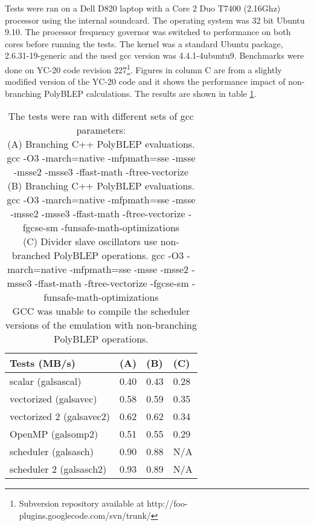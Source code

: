 \documentclass[11pt,a4paper]{article}
\begin{document}
Tests were ran on a Dell D820 laptop with a Core 2 Duo T7400 (2.16Ghz) processor using the internal soundcard. The operating system was 32 bit Ubuntu 9.10. The processor frequency governor was switched to performance on both cores before running the tests. The kernel was a standard Ubuntu package, 2.6.31-19-generic and the used gcc version was 4.4.1-4ubuntu9. Benchmarks were done on YC-20 code revision 227\footnote{Subversion repository available at http://foo-plugins.googlecode.com/svn/trunk/}. Figures in column C are from a slightly modified version of the YC-20 code and it shows the performance impact of non-branching PolyBLEP calculations. The results are shown in table \ref{table:performance}.

\begin{table}[h]
 \begin{center}
\begin{tabular}{|l|l|l|l|}

      \hline
      Tests (MB/s)             & (A)  & (B)  & (C) \\
      \hline\hline
      scalar (galsascal)       & 0.40 & 0.43 & 0.28 \\
      vectorized (galsavec)    & 0.58 & 0.59 & 0.35 \\
      vectorized 2 (galsavec2) & 0.62 & 0.62 & 0.34 \\
      OpenMP (galsomp2)        & 0.51 & 0.55 & 0.29 \\
      scheduler (galsasch)     & 0.90 & 0.88 & N/A \\
      scheduler 2 (galsasch2)  & 0.93 & 0.89 & N/A \\
      \hline

\end{tabular}
\caption{The tests were ran with different sets of gcc parameters: \\
(A) Branching C++ PolyBLEP evaluations. gcc -O3 -march=native -mfpmath=sse -msse -msse2 -msse3 -ffast-math -ftree-vectorize \\
(B) Branching C++ PolyBLEP evaluations. gcc -O3 -march=native -mfpmath=sse -msse -msse2 -msse3 -ffast-math -ftree-vectorize -fgcse-sm  -funsafe-math-optimizations \\
(C) Divider slave oscillators use non-branched PolyBLEP operations. gcc -O3 -march=native -mfpmath=sse -msse -msse2 -msse3 -ffast-math -ftree-vectorize -fgcse-sm  -funsafe-math-optimizations \\
GCC was unable to compile the scheduler versions of the emulation with non-branching PolyBLEP operations.\\
}\label{table:performance}
 \end{center}
\end{table}
\end{document}
